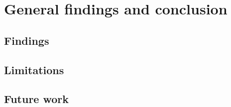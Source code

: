 
\chapter{General findings and conclusion} %

\label{chapter6} %

\section{Findings}

\section{Limitations}

\section{Future work}